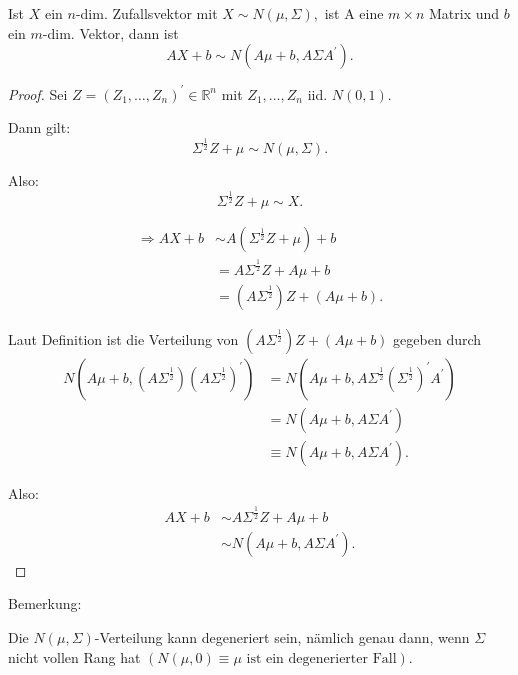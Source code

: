 \documentclass{tstextbook}
\begin{document}
\begin{theorem}[Reproduktionseigenschaft]
  \label{th:repoduktionseigenschaft}
  
  Ist $X$ ein $n$-dim. Zufallsvektor mit $X\sim N(\mu,\Sigma),$ ist
  A eine $m\times n$ Matrix und $b$ ein $m$-dim. Vektor, dann ist
  \[
  AX+b\sim N\left(A\mu+b,A\Sigma A^{\prime}\right).
  \]
\end{theorem}
  \begin{proof}
  
  Sei $Z=\left(Z_{1},\ldots,Z_{n}\right)^{\prime}\in\mathbb{R}^{n}$
  mit $Z_{1},\ldots,Z_{n}$ iid. $N(0,1).$
  
  Dann gilt:
  \[
  \Sigma^{\frac{1}{2}}Z+\mu\sim N\left(\mu,\Sigma\right).
  \]
  
  Also:
  \[
  \Sigma^{\frac{1}{2}}Z+\mu\sim X.
  \]
  
  \begin{align*}
  	\Rightarrow AX+b & \sim A\left(\Sigma^{\frac{1}{2}}Z+\mu\right)+b\\
  	& =A\Sigma^{\frac{1}{2}}Z+A\mu+b\\
  	& =\left(A\Sigma^{\frac{1}{2}}\right)Z+(A\mu+b).
  \end{align*}
  
  Laut Definition ist die Verteilung von $\left(A\Sigma^{\frac{1}{2}}\right)Z+(A\mu+b)$
  gegeben durch
  \begin{align*}
  	N\left(A\mu+b,\left(A\Sigma^{\frac{1}{2}}\right)\left(A\Sigma^{\frac{1}{2}}\right)^{\prime}\right) & =N\left(A\mu+b,A\Sigma^{\frac{1}{2}}\left(\Sigma^{\frac{1}{2}}\right)^{\prime}A^{\prime}\right)\\
  	& =N\left(A\mu+b,A\Sigma A^{\prime}\right)\\
  	& \equiv N\left(A\mu+b,A\Sigma A^{\prime}\right).
  \end{align*}
  
  Also:
  \begin{align*}
  	AX+b & \sim A\Sigma^{\frac{1}{2}}Z+A\mu+b\\
  	& \sim N\left(A\mu+b,A\Sigma A^{\prime}\right).
  \end{align*}
\end{proof}
  
 

\begin{remark}
 Bemerkung:

Die $N(\mu,\Sigma)$-Verteilung kann degeneriert sein, nämlich genau
dann, wenn $\Sigma$ nicht vollen Rang hat $\left(N(\mu,0)\equiv\mu\text{ ist ein degenerierter Fall}\right)$.
\end{remark}
\end{document}
